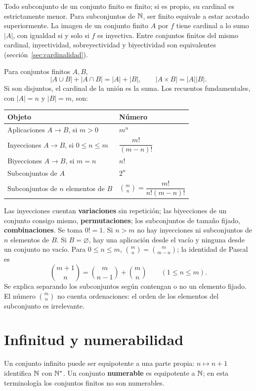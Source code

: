 Todo subconjunto de un conjunto finito es finito; si es propio, su
cardinal es estrictamente menor. Para subconjuntos de $\mathbb{N}$, ser finito
equivale a estar acotado superiormente. La imagen de un conjunto finito
$A$ por $f$ tiene cardinal a lo sumo $|A|$, con igualdad si y solo si
$f$ es inyectiva. Entre conjuntos finitos del mismo cardinal,
inyectividad, sobreyectividad y biyectividad son equivalentes
(sección~\ref{sec:cardinalidad}).

Para conjuntos finitos $A,B$,
\[
 |A\cup B|+|A\cap B|=|A|+|B|,\qquad |A\times B|=|A||B|.
\]
Si son disjuntos, el cardinal de la unión es la suma. Los recuentos
fundamentales, con $|A|=n$ y $|B|=m$, son:
\begin{center}
\begin{tabular}{@{}ll@{}}
\toprule
Objeto & Número\\
\midrule
Aplicaciones $A\to B$, si $m>0$ & $m^n$\\
Inyecciones $A\to B$, si $0\le n\le m$ & $\dfrac{m!}{(m-n)!}$\\[6pt]
Biyecciones $A\to B$, si $m=n$ & $n!$\\
Subconjuntos de $A$ & $2^n$\\
Subconjuntos de $n$ elementos de $B$ & $\displaystyle\binom mn=\dfrac{m!}{n!(m-n)!}$\\
\bottomrule
\end{tabular}
\end{center}
Las inyecciones cuentan \textbf{variaciones} sin repetición; las
biyecciones de un conjunto consigo mismo, \textbf{permutaciones};
los subconjuntos de tamaño fijado, \textbf{combinaciones}.
Se toma $0!=1$. Si $n>m$ no hay inyecciones ni subconjuntos de $n$
elementos de $B$. Si $B=\varnothing$, hay una aplicación desde el vacío
y ninguna desde un conjunto no vacío. Para $0\le n\le m$,
$\binom mn=\binom m{m-n}$; la identidad de Pascal es
\[
 \binom{m+1}{n}=\binom m{n-1}+\binom mn\qquad(1\le n\le m).
\]
Se explica separando los subconjuntos según contengan o no un elemento
fijado. El número $\binom mn$ no cuenta ordenaciones: el orden de los
elementos del subconjunto es irrelevante.

\section{Infinitud y numerabilidad}
\label{sec:numerabilidad}
Un conjunto infinito puede ser equipotente a una parte propia:
$n\mapsto n+1$ identifica $\mathbb{N}$ con $\mathbb{N}^*$.
Un conjunto \textbf{numerable} es equipotente a $\mathbb{N}$; en esta terminología
los conjuntos finitos no son numerables.

